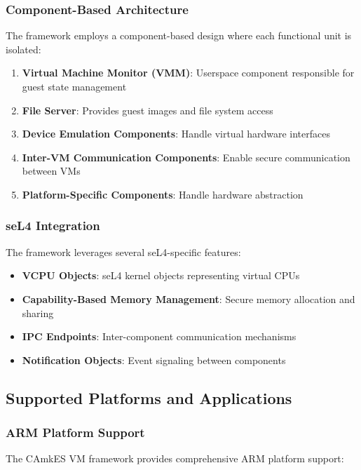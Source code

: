 \documentclass[11pt,a4paper]{article}
\begin{document}
\subsubsection{Component-Based Architecture}

The framework employs a component-based design where each functional unit is isolated:

\begin{enumerate}
\item \textbf{Virtual Machine Monitor (VMM)}: Userspace component responsible for guest state management
\item \textbf{File Server}: Provides guest images and file system access
\item \textbf{Device Emulation Components}: Handle virtual hardware interfaces
\item \textbf{Inter-VM Communication Components}: Enable secure communication between VMs
\item \textbf{Platform-Specific Components}: Handle hardware abstraction
\end{enumerate}

\subsubsection{seL4 Integration}

The framework leverages several seL4-specific features:

\begin{itemize}
\item \textbf{VCPU Objects}: seL4 kernel objects representing virtual CPUs
\item \textbf{Capability-Based Memory Management}: Secure memory allocation and sharing
\item \textbf{IPC Endpoints}: Inter-component communication mechanisms
\item \textbf{Notification Objects}: Event signaling between components
\end{itemize}

\subsection{Supported Platforms and Applications}

\subsubsection{ARM Platform Support}

The CAmkES VM framework provides comprehensive ARM platform support:
\end{document}
